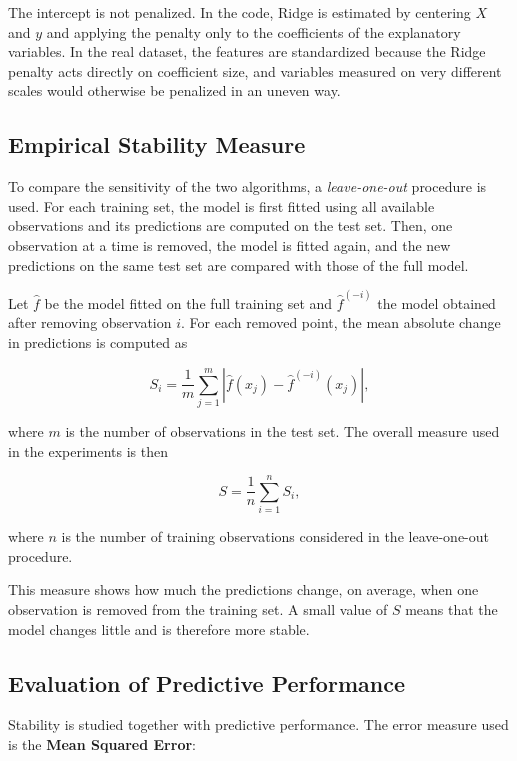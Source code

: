 \documentclass[11pt,a4paper]{article}
\begin{document}
The intercept is not penalized. In the code, Ridge is estimated by centering $X$ and $y$ and applying the penalty only to the coefficients of the explanatory variables. In the real dataset, the features are standardized because the Ridge penalty acts directly on coefficient size, and variables measured on very different scales would otherwise be penalized in an uneven way.

\subsection{Empirical Stability Measure}

To compare the sensitivity of the two algorithms, a \emph{leave-one-out} procedure is used. For each training set, the model is first fitted using all available observations and its predictions are computed on the test set. Then, one observation at a time is removed, the model is fitted again, and the new predictions on the same test set are compared with those of the full model.

Let $\hat{f}$ be the model fitted on the full training set and $\hat{f}^{(-i)}$ the model obtained after removing observation $i$. For each removed point, the mean absolute change in predictions is computed as

\begin{equation}
    S_i = \frac{1}{m}\sum_{j=1}^{m}
    \left|
    \hat{f}(x_j)-\hat{f}^{(-i)}(x_j)
    \right|,
\end{equation}

where $m$ is the number of observations in the test set. The overall measure used in the experiments is then

\begin{equation}
    S = \frac{1}{n}\sum_{i=1}^{n} S_i,
\end{equation}

where $n$ is the number of training observations considered in the leave-one-out procedure.

This measure shows how much the predictions change, on average, when one observation is removed from the training set. A small value of $S$ means that the model changes little and is therefore more stable.

\subsection{Evaluation of Predictive Performance}

Stability is studied together with predictive performance. The error measure used is the \textbf{Mean Squared Error}:
\end{document}
